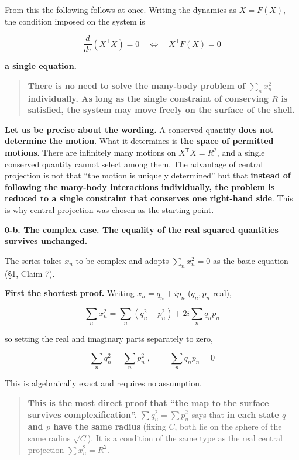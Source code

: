 \documentclass[
  10pt,
]{article}
\begin{document}
From this the following follows at once. Writing the dynamics as
\(\dot X = F(X)\), the condition imposed on the system is

\[\frac{d}{d\tau}\left(X^{\mathsf T}X\right) = 0 \quad\Longleftrightarrow\quad X^{\mathsf T}F(X) = 0\]

\textbf{a single equation.}

\begin{quote}
\textbf{There is no need to solve the many-body problem of
\(\sum_n x_n^2\) individually. As long as the single constraint of
conserving \(R\) is satisfied, the system may move freely on the surface
of the shell.}
\end{quote}

\textbf{Let us be precise about the wording.} A conserved quantity
\textbf{does not determine the motion}. What it determines is
\textbf{the space of permitted motions}. There are infinitely many
motions on \(X^{\mathsf T}X = R^2\), and a single conserved quantity
cannot select among them. The advantage of central projection is not
that ``the motion is uniquely determined'' but that \textbf{instead of
following the many-body interactions individually, the problem is
reduced to a single constraint that conserves one right-hand side}. This
is why central projection was chosen as the starting point.

\textbf{0-b. The complex case. The equality of the real squared
quantities survives unchanged.}

The series takes \(x_n\) to be complex and adopts \(\sum_n x_n^2 = 0\)
as the basic equation (§1, Claim 7).

\textbf{First the shortest proof.} Writing \(x_n = q_n + ip_n\)
(\(q_n, p_n\) real),

\[\sum_n x_n^2 = \sum_n (q_n^2 - p_n^2) + 2i\sum_n q_np_n\]

so setting the real and imaginary parts separately to zero,

\[\boxed{\;\sum_n q_n^2 = \sum_n p_n^2\;}, \qquad \boxed{\;\sum_n q_np_n = 0\;}\]

This is algebraically exact and requires no assumption.

\begin{quote}
\textbf{This is the most direct proof that ``the map to the surface
survives complexification''.} \(\sum q_n^2 = \sum p_n^2\) says that
\textbf{in each state \(q\) and \(p\) have the same radius} (fixing
\(C\), both lie on the sphere of the same radius \(\sqrt{C}\)). It is a
condition of the same type as the real central projection
\(\sum x_n^2 = R^2\).
\end{quote}
\end{document}
